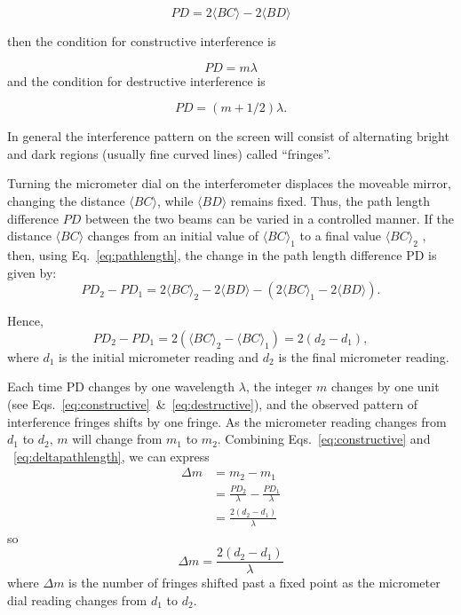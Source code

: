 \begin{equation}
PD = 2\langle BC\rangle - 2\langle BD\rangle 
\label{eq:pathlength}
\end{equation}

then the condition for constructive interference is 

\begin{equation}
 PD = m\lambda
\label{eq:constructive}
\end{equation}
and the condition for destructive interference is

\begin{equation}
PD = (m+1/2)\lambda.
\label{eq:destructive}
\end{equation}

In general the interference pattern on the screen will consist of alternating
bright and dark regions (usually fine curved lines) called
``fringes''.

Turning the micrometer dial on the interferometer displaces the moveable mirror,
changing the distance $\langle BC \rangle$, while $\langle BD\rangle $ remains
fixed. Thus, the path length difference $PD$ between the two beams can be varied
in a controlled manner. If the distance $\langle BC\rangle$ changes from an
initial value of $\langle BC\rangle_{1}$ to a final value $\langle
BC\rangle_{2}$ , then, using Eq.~\ref{eq:pathlength}, the change in the path
length difference PD is given by:
\begin{equation}
 PD_2 - PD_{1} = 2\langle BC\rangle_{2} - 2\langle BD\rangle - (2\langle
 BC\rangle_{1} - 2\langle BD\rangle).
\label{eq:deltapathlength}
\end{equation}

\noindent Hence,
\begin{equation}
PD_{2} - PD_{1} = 2(\langle BC\rangle_{2}  - \langle BC\rangle_{1}) = 2(d_{2} -
d_{1}),
\end{equation}
\noindent where $d_{1}$ is the initial micrometer reading and $d_{2}$ is the
final micrometer reading. 

Each time PD changes by one wavelength $\lambda$, the integer $m$ changes
by one unit (see Eqs.~\ref{eq:constructive}~\&~\ref{eq:destructive}), and the
observed pattern of interference fringes shifts by one fringe. As the micrometer
reading changes from $d_{1}$ to $d_{2}$, $m$ will change from $m_{1}$ to
$m_{2}$. Combining Eqs.~\ref{eq:constructive} and ~\ref{eq:deltapathlength}, we
can express 
\begin{align}
 \Delta m &= m_2 - m_1 \nonumber \\
 &= \frac{PD_{2}}{\lambda} - \frac{PD_{1}}{\lambda} \nonumber \\
 &= \frac{2(d_{2} - d_{1})} {\lambda} \nonumber
\end{align}
so
\begin{equation}
\boxed{\Delta m = \frac{2(d_{2} - d_{1})} {\lambda}}
\label{eq:delta-m}
\end{equation}
where $\Delta m$ is the number of fringes shifted past a fixed point as the
micrometer dial reading changes from $d_{1}$ to $d_{2}$. 

